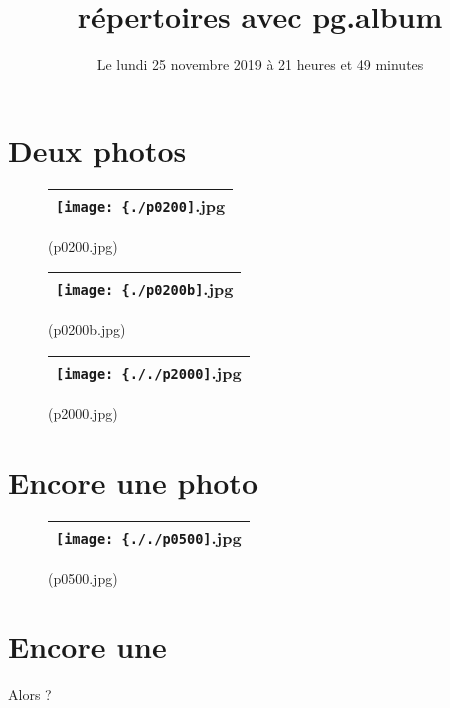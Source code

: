 \documentclass[12pt,french]{article}
\begin{document}
\title{répertoires avec pg.album}
\author{}
\date{Le lundi 25 novembre 2019 à 21 heures et 49 minutes}
\maketitle
\tableofcontents
\newpage
\vspace {25mm}

\clearpage
%
\section{Deux photos}
%

  \begin{figure}[H]
    \label{p0200.jpg}
    \noindent \centering{}
    \begin{tabular}{|c|}
      \hline
          \texttt{[image: \{./p0200]}.jpg}
        \tabularnewline \hline
    \end{tabular}
    \vspace{2mm}
    \caption{
      (p0200.jpg) 
    }
  \end{figure}

  \begin{figure}[H]
    \label{p0200b.jpg}
    \noindent \centering{}
    \begin{tabular}{|c|}
      \hline
          \texttt{[image: \{./p0200b]}.jpg}
        \tabularnewline \hline
    \end{tabular}
    \vspace{2mm}
    \caption{
      (p0200b.jpg) 
    }
  \end{figure}

  \begin{figure}[H]
    \label{p2000.jpg}
    \noindent \centering{}
    \begin{tabular}{|c|}
      \hline
          \texttt{[image: \{././p2000]}.jpg}
        \tabularnewline \hline
    \end{tabular}
    \vspace{2mm}
    \caption{
      (p2000.jpg) 
    }
  \end{figure}
\clearpage
%
\section{Encore une photo}
%

  \begin{figure}[H]
    \label{p0500.jpg}
    \noindent \centering{}
    \begin{tabular}{|c|}
      \hline
          \texttt{[image: \{././p0500]}.jpg}
        \tabularnewline \hline
    \end{tabular}
    \vspace{2mm}
    \caption{
      (p0500.jpg) 
    }
  \end{figure}
\clearpage
%
\section{Encore une}
%

 Alors ?

%
\end{document}
